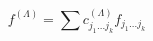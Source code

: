 \begin{equation}
f^{(\Lambda)} = \sum c^{(\Lambda)}_{j_1 \dots j_k} f_{j_1 \dots j_k}
\end{equation}

